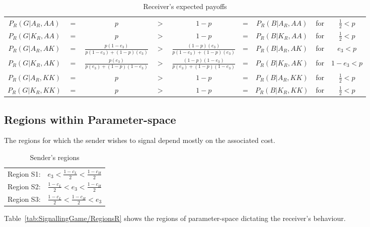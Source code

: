 \documentclass[a4paper,12pt]{article}
\numberwithin{equation}{section}
\begin{document}
\begin{table}[h]
\setlength{\tabcolsep}{.22em}
\begin{center}
\begin{tabular}{ccccccccc}
$P_{R}(G|A_{R},AA)$ & $=$ & $p$ & $>$ & $1-p$ & = & $P_{R}(B|A_{R},AA)$ & for & $\frac{1}{2}<p$\\
$P_{R}(G|K_{R},AA)$ & $=$ & $p$ & $>$ & $1-p$ & = & $P_{R}(B|K_{R},AA)$ & for & $\frac{1}{2}<p$\\
$P_{R}(G|A_{R},AK)$ & $=$ & $\frac{p(1-e_{3})}{p(1-e_{3})+(1-p)(e_{3})}$ & $>$ & $\frac{(1-p)(e_{3})}{p(1-e_{3})+(1-p)(e_{3})}$ & = & $P_{R}(B|A_{R},AK)$ & for & $e_{3}<p$\\
$P_{R}(G|K_{R},AK)$ & $=$ & $\frac{p(e_{3})}{p(e_{3})+(1-p)(1-e_{3})}$ & $>$ & $\frac{(1-p)(1-e_{3})}{p(e_{3})+(1-p)(1-e_{3})}$ & = & $P_{R}(B|K_{R},AK)$ & for & $1-e_{3}<p$\\
$P_{R}(G|A_{R},KK)$ & $=$ & $p$ & $>$ & $1-p$ & = & $P_{R}(B|A_{R},KK)$ & for & $\frac{1}{2}<p$\\
$P_{R}(G|K_{R},KK)$ & $=$ & $p$ & $>$ & $1-p$ & = & $P_{R}(B|K_{R},KK)$ & for & $\frac{1}{2}<p$
\end{tabular}
\end{center}
\caption{Receiver's expected payoffs}
\label{tab:SignallingGame/ConditionalPayoffsR}
\end{table}


\subsection{Regions within Parameter-space}
\label{sec:Signalling Game/Regions}

The regions for which the sender wishes to signal depend mostly on the associated cost.

\begin{table}[h]
\begin{center}
\begin{tabular}{lc}
Region S1: & $e_{3}<\frac{1-c_{L}}{2}<\frac{1-c_{H}}{2}$\\
Region S2: & $\frac{1-c_{L}}{2}<e_{3}<\frac{1-c_{H}}{2}$\\
Region S3: & $\frac{1-c_{L}}{2}<\frac{1-c_{H}}{2}<e_{3}$
\end{tabular}
\end{center}
\caption{Sender's regions}
\label{tab:SignallingGame/RegionsS}
\end{table}

Table~\ref{tab:SignallingGame/RegionsR} shows the regions of parameter-space dictating the receiver's behaviour.
\end{document}
